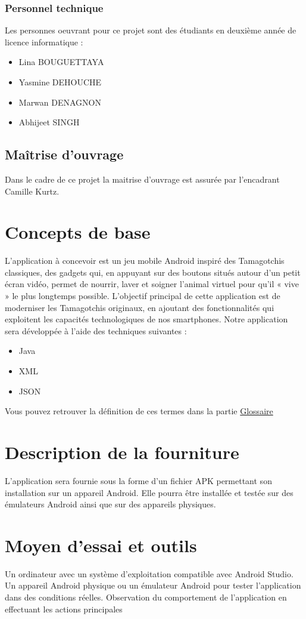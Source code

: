 \documentclass{cahier_de_recette}
\begin{document}
\subsubsection{Personnel technique}
Les personnes oeuvrant pour ce projet sont des étudiants en deuxième année de licence informatique :
\begin{itemize}[label=\textbullet]
\item Lina BOUGUETTAYA 
\item Yasmine DEHOUCHE
\item Marwan DENAGNON 
\item Abhijeet SINGH
\end{itemize}
\subsection{Maîtrise d'ouvrage}
Dans le cadre de ce projet la maitrise d’ouvrage est assurée par l’encadrant Camille Kurtz.
\section{Concepts de base}
L’application à concevoir est un jeu mobile Android inspiré des Tamagotchis classiques, des gadgets qui, en appuyant sur des boutons situés autour d'un petit écran vidéo, permet de nourrir, laver et soigner l'animal virtuel pour qu'il « vive » le plus longtemps possible. L’objectif principal de cette application est de moderniser les Tamagotchis originaux, en ajoutant des fonctionnalités qui exploitent les capacités technologiques de nos smartphones. Notre application sera développée à l’aide des techniques suivantes :
\begin{itemize}[label=\textbullet]
\item Java
\item XML
\item JSON
\end{itemize}
Vous pouvez retrouver la définition de ces termes dans la partie \protect\hyperref[sec:glossaire]{Glossaire}

\section{Description de la fourniture}
L’application sera fournie sous la forme d’un fichier APK permettant son installation sur un
appareil Android. Elle pourra être installée et testée sur des émulateurs Android ainsi que sur des
appareils physiques.
\section{Moyen d'essai et outils}
Un ordinateur avec un système d’exploitation compatible avec Android Studio.
Un appareil Android physique ou un émulateur Android pour tester l’application dans des
conditions réelles.
Observation du comportement de l’application en effectuant les actions principales
\end{document}
